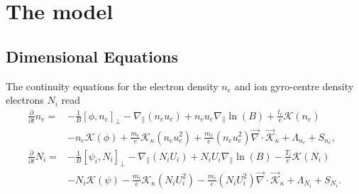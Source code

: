 \section{The model}
\subsection{Dimensional Equations}
The continuity equations for the electron density \(n_e\) and  ion gyro-centre density electrons  \(N_i\) read
\begin{align}
 \frac{\partial}{\partial t}n_e =&
 - \frac{1}{B}\left[\phi,  n_e \right]_{\perp}
 -  {\nabla}_{\parallel}( n_e u_e)
 + n_e u_e   {\nabla}_{\parallel} \ln{(B)}
+ \frac{t_e }{e }  \mathcal{K} \left( n_e\right)
\nonumber  \\ &
-   n_e \mathcal{K}(\phi)
   +  \frac{m_e }{ e } \mathcal{K}_{\kappa} \left( n_e u_e^2 \right)
   + \frac{m_e }{ e } \left( n_e u_e^2 \right) \vec{\nabla} \cdot  \vec{\mathcal{K}}_{\kappa}
   + \Lambda_{n_e} + S_{n_e},\\
\frac{\partial}{\partial t}N_i =&
 - \frac{1}{B}\left[\psi_i,  N_i \right]_{\perp}
 - {\nabla}_{\parallel}(N_i U_i)
 + N_i U_i   {\nabla}_{\parallel} \ln{(B)}
- \frac{T_i }{e }  \mathcal{K} \left( N_i\right)
\nonumber  \\ &
-   N_i \mathcal{K}(\psi)
- \frac{m_i }{ e }\mathcal{K}_{\kappa}  \left( N_i U_i^2 \right)
- \frac{m_i }{ e } \left( N_i U_i^2 \right)\vec{\nabla} \cdot  \vec{\mathcal{K}}_{\kappa}
+ \Lambda_{N_i} + S_{N_i}.
\end{align}
